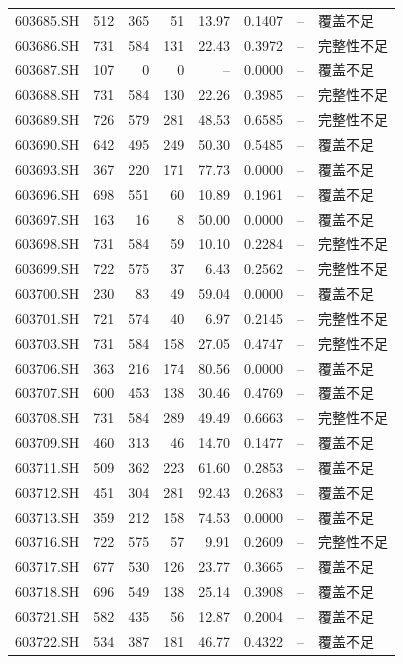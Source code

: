 \documentclass[10pt,a4paper]{article}
\begin{document}
\begin{longtable}{lrrr r r r l}
603685.SH & 512 & 365 & 51 & 13.97 & 0.1407 & -- & 覆盖不足\\
603686.SH & 731 & 584 & 131 & 22.43 & 0.3972 & -- & 完整性不足\\
603687.SH & 107 & 0 & 0 & -- & 0.0000 & -- & 覆盖不足\\
603688.SH & 731 & 584 & 130 & 22.26 & 0.3985 & -- & 完整性不足\\
603689.SH & 726 & 579 & 281 & 48.53 & 0.6585 & -- & 完整性不足\\
603690.SH & 642 & 495 & 249 & 50.30 & 0.5485 & -- & 覆盖不足\\
603693.SH & 367 & 220 & 171 & 77.73 & 0.0000 & -- & 覆盖不足\\
603696.SH & 698 & 551 & 60 & 10.89 & 0.1961 & -- & 覆盖不足\\
603697.SH & 163 & 16 & 8 & 50.00 & 0.0000 & -- & 覆盖不足\\
603698.SH & 731 & 584 & 59 & 10.10 & 0.2284 & -- & 完整性不足\\
603699.SH & 722 & 575 & 37 & 6.43 & 0.2562 & -- & 完整性不足\\
603700.SH & 230 & 83 & 49 & 59.04 & 0.0000 & -- & 覆盖不足\\
603701.SH & 721 & 574 & 40 & 6.97 & 0.2145 & -- & 完整性不足\\
603703.SH & 731 & 584 & 158 & 27.05 & 0.4747 & -- & 完整性不足\\
603706.SH & 363 & 216 & 174 & 80.56 & 0.0000 & -- & 覆盖不足\\
603707.SH & 600 & 453 & 138 & 30.46 & 0.4769 & -- & 覆盖不足\\
603708.SH & 731 & 584 & 289 & 49.49 & 0.6663 & -- & 完整性不足\\
603709.SH & 460 & 313 & 46 & 14.70 & 0.1477 & -- & 覆盖不足\\
603711.SH & 509 & 362 & 223 & 61.60 & 0.2853 & -- & 覆盖不足\\
603712.SH & 451 & 304 & 281 & 92.43 & 0.2683 & -- & 覆盖不足\\
603713.SH & 359 & 212 & 158 & 74.53 & 0.0000 & -- & 覆盖不足\\
603716.SH & 722 & 575 & 57 & 9.91 & 0.2609 & -- & 完整性不足\\
603717.SH & 677 & 530 & 126 & 23.77 & 0.3665 & -- & 覆盖不足\\
603718.SH & 696 & 549 & 138 & 25.14 & 0.3908 & -- & 覆盖不足\\
603721.SH & 582 & 435 & 56 & 12.87 & 0.2004 & -- & 覆盖不足\\
603722.SH & 534 & 387 & 181 & 46.77 & 0.4322 & -- & 覆盖不足\\

\end{longtable}
\end{document}
